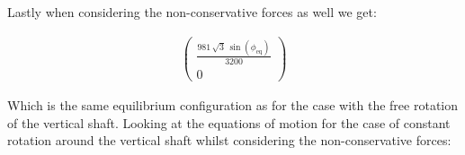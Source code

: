 
Lastly when considering the non-conservative forces as well we get:

\begin{equation}
    \begin{split}
        \left(\begin{array}{c} \frac{981\,\sqrt{3}\,\sin\left(\phi _{\mathrm{eq}}\right)}{3200}\\ 0 \end{array}\right)
    \end{split}
\end{equation}

Which is the same equilibrium configuration as for the case with the free rotation of the vertical shaft.
\clearpage
Looking at the equations of motion for the case of constant rotation around the vertical shaft whilst considering the non-conservative forces:

